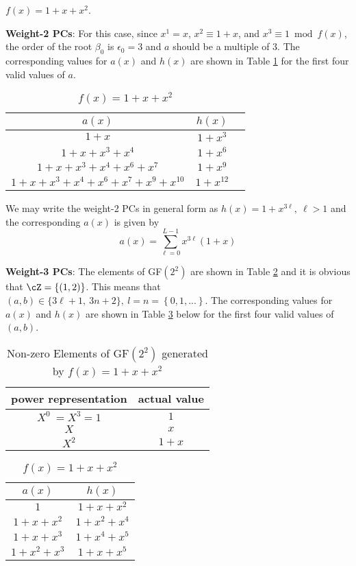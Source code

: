 \begin{example}$f(x)=1+x+x^2$.\newline 

\textbf{Weight-2 PCs}: 
For this case, since $x^1=x$, $x^2 \equiv 1+x$, and $x^3 \equiv 1 \bmod f(x)$, the order of the root $\beta_0$ is $\epsilon_0=3$ and $a$ should be a multiple of $3$. The corresponding values for $a(x)$ and $h(x)$ are shown in Table \ref{novelTab2} for the first four valid values of $a$.
\begin{table}[htbp]
 \caption{$f(x)=1+x+x^2$}
\centering
 \begin{tabular}{c c c} 
 $a(x)$ & $h(x)$ \\ [0.5ex] 
 \hline\hline
$1+x$
 & $1+x^{3}$ \\
\hline
$1+x+x^3+x^4$
 & $1+x^{6}$ 
 \\
\hline
$1+x+x^3+x^4+x^6+x^{7}$ 
&  $1+x^{9}$ 
\\
\hline
$1+x+x^3+x^4+x^6+x^{7}+x^9+x^{10}$
 &  $1+x^{12}$ \\
 \end{tabular}
 \label{novelTab2}
\end{table}
\label{ex-2}

We may write the weight-2 PCs in general form as $h(x)=1+x^{3\ell},~\ell>1$ and the corresponding $a(x)$ is given by 
\begin{equation*}
a(x)=\sum_{\ell=0}^{L-1} x^{3\ell}(1+x)
\end{equation*}

\textbf{Weight-3 PCs}: The elements of GF$(2^2)$ are shown in Table \ref{novelTab7} and it is obvious that $\cZ=\{(1,2)\}$.
This means that $(a,b) \in \{3\ell+1,~3n+2\},~l=n=\left\{0,1,...\right\}$.  The corresponding values for $a(x)$ and $h(x)$ are shown in Table \ref{novelTab8} below for the first four valid values of $(a,b)$.
 \begin{table}[htbp]
 \caption{Non-zero Elements of GF$(2^2)$ generated by $f(x)=1+x+x^2$}
\centering
 \begin{tabular}{c c} 
 \hline
 power representation & actual value \\ [0.5ex] 
 \hline\hline
$X^0~=X^3=1$ & $1$\\
\hline
$X$ & $x$\\
\hline
$X^2$ &  $1+x$\\
\hline
 \end{tabular}
 \label{novelTab7}
\end{table}

\begin{table}[htbp]
 \caption{$f(x)=1+x+x^2$}
\centering
 \begin{tabular}{c c} 
 \hline
 $a(x)$ & $h(x)$\\ [0.5ex] 
 \hline\hline
$1$ & $1+x+x^2$\\ 
\hline
$1+x+x^2$ &  $1+x^2+x^4$\\
\hline
$1+x+x^3$ & $1+x^4+x^5$\\
\hline
$1+x^2+x^3$ & $1+x+x^5$ 
 \end{tabular}
 \label{novelTab8}
\end{table}


\end{example}
